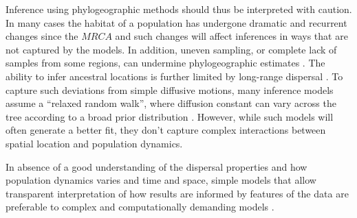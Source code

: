 \documentclass[aps,rmp, twocolumn]{revtex4}
\begin{document}
Inference using phylogeographic methods should thus be interpreted with caution.
In many cases the habitat of a population has undergone dramatic and recurrent changes since the $MRCA$ and such changes will affect inferences in ways that are not captured by the models.
In addition, uneven sampling, or complete lack of samples from some regions, can undermine phylogeographic estimates \citep{kalkauskas_sampling_2021}.
The ability to infer ancestral locations is further limited by long-range dispersal \citep{hallatschek_acceleration_2014}.
To capture such deviations from simple diffusive motions, many inference models assume a ``relaxed random walk'', where diffusion constant can vary across the tree according to a broad prior distribution \citep{dellicour_relax_2021}.
However, while such models will often generate a better fit, they don't capture complex interactions between spatial location and population dynamics.

In absence of a good understanding of the dispersal properties and how population dynamics varies and time and space, simple models that allow transparent interpretation of how results are informed by features of the data are preferable to complex and computationally demanding models \citep{layan_impact_2023}.


\end{document}
